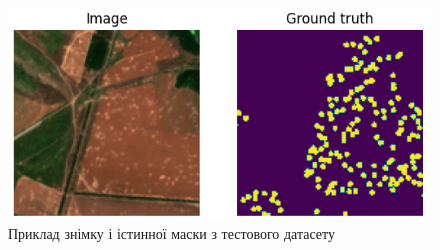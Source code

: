 \begin{figure}[ht]
      \centering
      \includegraphics[scale=1]{Images/image_and_gt.png}
      \caption{Приклад знімку і істинної маски з тестового датасету}
      \label{image_and_gt}
\end{figure}

